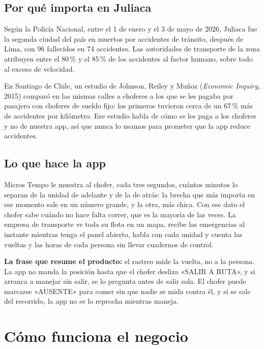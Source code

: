 \documentclass[a4paper]{article}
\begin{document}
\subsection{Por qué importa en Juliaca}

Según la Policía Nacional, entre el 1 de enero y el 3 de mayo de 2026, Juliaca fue la segunda ciudad del país en muertos por accidentes de tránsito, después de Lima, con 96 fallecidos en 74 accidentes. Las autoridades de transporte de la zona atribuyen entre el 80\,\% y el 85\,\% de los accidentes al factor humano, sobre todo al exceso de velocidad.

En Santiago de Chile, un estudio de Johnson, Reiley y Muñoz (\emph{Economic Inquiry}, 2015) comparó en las mismas calles a choferes a los que se les pagaba por pasajero con choferes de sueldo fijo: los primeros tuvieron cerca de un 67\,\% más de accidentes por kilómetro. Ese estudio habla de cómo se les paga a los choferes y no de nuestra app, así que nunca lo usamos para prometer que la app reduce accidentes.

\subsection{Lo que hace la app}

Micros Tempo le muestra al chofer, cada tres segundos, cuántos minutos lo separan de la unidad de adelante y de la de atrás: la brecha que más importa en ese momento sale en un número grande, y la otra, más chica. Con ese dato el chofer sabe cuándo no hace falta correr, que es la mayoría de las veces. La empresa de transporte ve toda su flota en un mapa, recibe las emergencias al instante mientras tenga el panel abierto, habla con cada unidad y cuenta las vueltas y las horas de cada persona sin llevar cuadernos de control.

\begin{aviso}
\textbf{La frase que resume el producto:} el rastreo mide la vuelta, no a la persona. La app no manda la posición hasta que el chofer desliza «SALIR A RUTA», y si arranca a manejar sin salir, se lo pregunta antes de salir sola. El chofer puede marcarse «AUSENTE» para comer sin que nadie se mida contra él, y si se sale del recorrido, la app no se lo reprocha mientras maneja.
\end{aviso}

\section{Cómo funciona el negocio}
\end{document}
